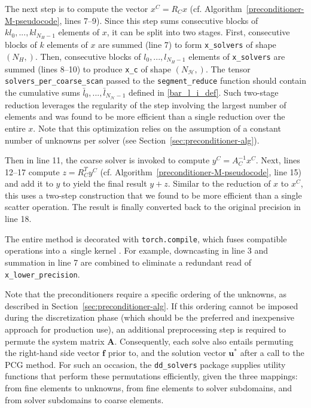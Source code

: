 \documentclass[11pt]{article}
\theoremstyle{definition}
\theoremstyle{theorem}
\begin{document}
The next step is to compute the vector $x^C=R_C x$ (cf.
Algorithm~\ref{preconditioner-M-pseudocode}, lines 7\nobreakdash--9).
Since this step sums consecutive blocks of
$kl_0, ..., kl_{N_H-1}$ elements of $x$, it can be split into two stages.
First, consecutive blocks of
$k$ elements of $x$ are summed (line 7) to form \verb|x_solvers| of
shape $(N_H,)$. Then, consecutive blocks of $l_0, ..., l_{N_H-1}$ elements of
\verb|x_solvers| are summed (lines 8--10) to produce \verb|x_c| of shape
$(N_{\mathcal{H}}, )$. The tensor \verb|solvers_per_coarse_scan| passed to the
\verb|segment_reduce| function should contain the cumulative sums
$\bar l_0, ..., \bar l_{N_{\mathcal{H}}-1}$ defined in \eqref{bar_l_i_def}.
Such two-stage reduction leverages the regularity of the step involving the
largest number of elements and was found to be more efficient than a single
reduction over the entire $x$. Note that this optimization relies on the
assumption of a constant number of unknowns per solver
(see Section~\ref{sec:preconditioner-alg}).

Then in line 11, the coarse solver is invoked to compute $y^C=A_C^{-1} x^C$.
Next, lines 12--17 compute $z=R_C^T y^C$ (cf. Algorithm~\ref{preconditioner-M-pseudocode}, line 15)
and add it to $y$ to yield the final result $y+z$.
Similar to the reduction of $x$ to $x^C$, this uses a two-step construction
that we found to be more efficient than a single scatter operation.
The result is finally converted back to the original precision in line 18.

The entire method is decorated with \verb|torch.compile|, which fuses compatible
operations into a~single kernel \cite{pytorch2}. For example, downcasting in line 3 and
summation in line 7 are combined to eliminate a redundant read of
\verb|x_lower_precision|.

Note that the preconditioners require a specific ordering of the unknowns,
as described in Section~\ref{sec:preconditioner-alg}. If this ordering cannot be
imposed during the discretization phase (which should be the preferred and
inexpensive approach for production use),
an additional preprocessing step is required to
permute the system matrix $\bm{A}$. Consequently, each solve also entails permuting
the right-hand side vector $\bm{f}$ prior to, and the solution vector $\bm{u^*}$
after a call to the PCG method. For such an occasion,
the \verb|dd_solvers| package supplies utility functions that perform these permutations
efficiently, given the three mappings: from fine elements to unknowns, from
fine elements to solver subdomains, and from solver subdomains to coarse elements.
\end{document}
